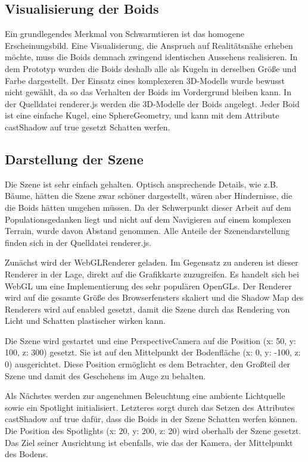 \documentclass[draft=false
              ,paper=a4
              ,twoside=false
              ,fontsize=11pt
              ,headsepline
              ,BCOR10mm
              ,DIV11
              ,bibtotoc
              ,liststotoc
              ]{scrbook}
\begin{document}
\subsection{Visualisierung der Boids}
Ein grundlegendes Merkmal von Schwarmtieren ist das homogene Erscheinungsbild. Eine Visualisierung, die Anspruch auf Realitätsnähe erheben möchte, muss die Boids demnach zwingend identischen Aussehens realisieren. In dem Prototyp wurden die Boids deshalb alle als Kugeln in derselben Größe und Farbe dargestellt. Der Einsatz eines komplexeren 3D-Modells wurde bewusst nicht gewählt, da so das Verhalten der Boids im Vordergrund bleiben kann. In der Quelldatei renderer.js werden die 3D-Modelle der Boids angelegt. Jeder Boid ist eine einfache Kugel, eine SphereGeometry, und kann mit dem Attribute castShadow auf true gesetzt Schatten werfen.

\subsection{Darstellung der Szene}
Die Szene ist sehr einfach gehalten. Optisch ansprechende Details, wie z.B. Bäume, hätten die Szene zwar schöner dargestellt, wären aber Hindernisse, die die Boids hätten umgehen müssen. Da der Schwerpunkt dieser Arbeit auf dem Populationsgedanken liegt und nicht auf dem Navigieren auf einem komplexen Terrain, wurde davon Abstand genommen. Alle Anteile der Szenendarstellung finden sich in der Quelldatei renderer.js.

Zunächst wird der WebGLRenderer geladen. Im Gegensatz zu anderen ist dieser Renderer in der Lage, direkt auf die Grafikkarte zuzugreifen. Es handelt sich bei WebGL um eine Implementierung des sehr populären OpenGLs. Der Renderer wird auf die gesamte Größe des Browserfensters skaliert und die Shadow Map des Renderers wird auf enabled gesetzt, damit die Szene durch das Rendering von Licht und Schatten plastischer wirken kann.

Die Szene wird gestartet und eine PerspectiveCamera auf die Position (x: 50, y: 100, z: 300) gesetzt. Sie ist auf den Mittelpunkt der Bodenfläche (x: 0, y: -100, z: 0) ausgerichtet. Diese Position ermöglicht es dem Betrachter, den Großteil der Szene und damit des Geschehens im Auge zu behalten.

Als Nächstes werden zur angenehmen Beleuchtung eine ambiente Lichtquelle sowie ein Spotlight initialisiert. Letzteres sorgt durch das Setzen des Attributes castShadow auf true dafür, dass die Boids in der Szene Schatten werfen können. Die Position des Spotlights (x: 20, y: 200, z: 20) wird oberhalb der Szene gesetzt. Das Ziel seiner Ausrichtung ist ebenfalls, wie das der Kamera, der Mittelpunkt des Bodens.
\end{document}
